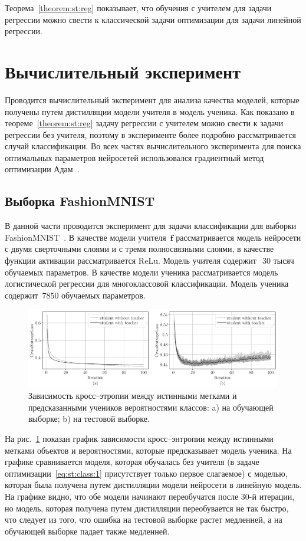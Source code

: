 \documentclass[12pt, twoside]{article}
\begin{document}
Теорема~\ref{theorem:st:reg} показывает, что обучения с учителем для задачи регрессии можно свести к классической задачи оптимизации для задачи линейной регрессии.

\section{Вычислительный эксперимент}
Проводится вычислительный эксперимент для анализа качества моделей, которые получены путем дистилляции модели учителя в модель ученика. Как показано в теореме~\ref{theorem:st:reg} задачу регрессии с учителем можно свести к задачи регрессии без учителя, поэтому в эксперименте более подробно рассматривается случай классификации. Во всех частях вычислительного эксперимента для поиска оптимальных параметров нейросетей использовался градиентный метод оптимизации Адам~\cite{kingma2014}.
\subsection{Выборка FashionMNIST}
В данной части проводится эксперимент для задачи классификации для выборки FashionMNIST~\cite{fashionmnist}. В качестве модели учителя~$\mathbf{f}$ рассматривается модель нейросети с двумя сверточными слоями и с тремя полносвязными слоями, в качестве функции активации рассматривается ReLu. Модель учителя содержит~$~30$ тысяч обучаемых параметров. В качестве модели ученика рассматривается модель логистической регрессии для многоклассовой классификации. Модель ученика содержит~$7850$ обучаемых параметров.

\begin{figure}[h!t]\center
\includegraphics[width=1\textwidth]{figures/mnist_loss}
\caption{Зависимость кросс--этропии между истинными метками и предсказанными учеников вероятностями классов: a) на обучающей выборке; b) на тестовой выборке.}
\label{fg:ex:fashionmnist:loss}
\end{figure}

На рис.~\ref{fg:ex:fashionmnist:loss} показан график зависимости кросс--энтропии между истинными метками объектов и вероятностями, которые предсказывает модель ученика. На графике сравнивается моделя, которая обучалась без учителя (в задаче оптимизации~\eqref{eq:st:class:1} присутствует только первое слагаемое) с моделью, которая была получена путем дистилляции модели нейросети в линейную модель. На графике видно, что обе модели начинают переобучатся после 30-й итерации, но модель, которая получена путем дистилляции переобувается не так быстро, что следует из того, что ошибка на тестовой выборке растет медленней, а на обучающей выборке падает также медленней.
\end{document}
